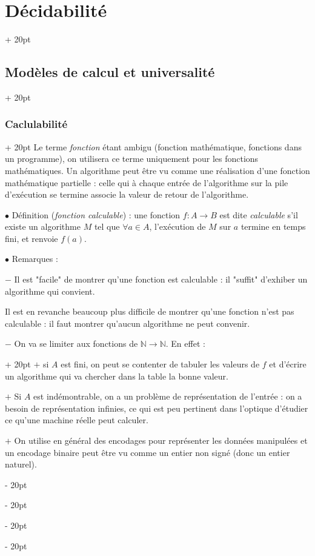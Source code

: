 \documentclass[a4paper, 12pt, twoside]{article}
\newcommand{\N}{\mathbb{N}} %
\newcommand{\ind}[1][20pt]{\advance\leftskip + #1}
\newcommand{\deind}[1][20pt]{\advance\leftskip - #1}
\newenvironment{indt}[2][20pt]{#2 \par \ind[#1]}{\par \deind} %
\begin{document}
\begin{indt}{\section{Décidabilité}}
\begin{indt}{\subsection{Modèles de calcul et universalité}}
\begin{indt}{\subsubsection{Caclulabilité}}
                Le terme \emph{fonction} étant ambigu (fonction mathématique, fonctions dans un programme), on utilisera ce terme uniquement pour les fonctions mathématiques. Un algorithme peut être vu comme une réalisation d'une fonction mathématique partielle : celle qui à chaque entrée de l'algorithme sur la pile d'exécution se termine associe la valeur de retour de l'algorithme.

                \vspace{12pt}
                
                $\bullet$ Définition (\emph{fonction calculable}) : une fonction $f : A \longrightarrow B$ est dite \emph{calculable} s'il existe un algorithme $M$ tel que $\forall a \in A$, l'exécution de $M$ sur $a$ termine en temps fini, et renvoie $f(a)$.

                \vspace{12pt}
                
                $\bullet$ Remarques :

                $-$ Il est "facile" de montrer qu'une fonction est calculable : il "suffit" d'exhiber un algorithme qui convient.

                Il est en revanche beaucoup plus difficile de montrer qu'une fonction n'est pas calculable : il faut montrer qu'aucun algorithme ne peut convenir.

                \vspace{6pt}
                
                \begin{indt}{$-$ On va se limiter aux fonctions de $\N \longrightarrow \N$. En effet :}
                    $+$ si $A$ est fini, on peut se contenter de tabuler les valeurs de $f$ et d'écrire un algorithme qui va chercher dans la table la bonne valeur.

                    $+$ Si $A$ est indémontrable, on a un problème de représentation de l'entrée : on a besoin de représentation infinies, ce qui est peu pertinent dans l'optique d'étudier ce qu'une machine réelle peut calculer.

                    $+$ On utilise en général des encodages pour représenter les données manipulées et un encodage binaire peut être vu comme un entier non signé (donc un entier naturel).
                \end{indt}

                \vspace{12pt}
                

\end{indt}
\end{indt}
\end{indt}
\end{document}
